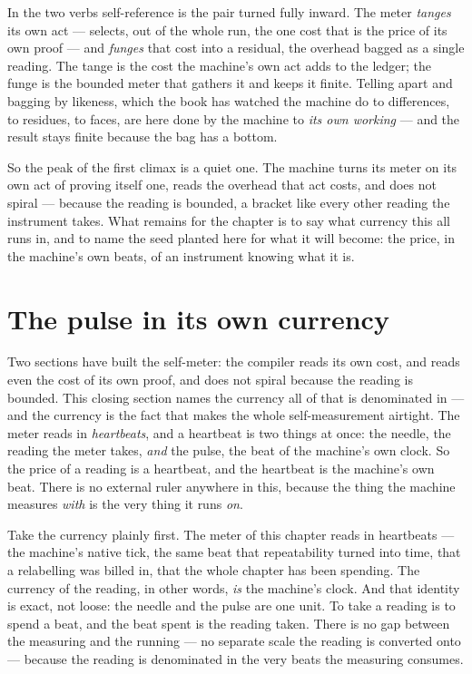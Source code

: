 In the two verbs self-reference is the pair turned fully inward. The meter \emph{tanges} its own act --- selects, out
of the whole run, the one cost that is the price of its own proof --- and \emph{funges} that cost into a residual, the
overhead bagged as a single reading. The tange is the cost the machine's own act adds to the ledger; the funge is the
bounded meter that gathers it and keeps it finite. Telling apart and bagging by likeness, which the book has watched
the machine do to differences, to residues, to faces, are here done by the machine to \emph{its own working} --- and
the result stays finite because the bag has a bottom.

So the peak of the first climax is a quiet one. The machine turns its meter on its own act of proving itself one, reads
the overhead that act costs, and does not spiral --- because the reading is bounded, a bracket like every other reading
the instrument takes. What remains for the chapter is to say what currency this all runs in, and to name the seed
planted here for what it will become: the price, in the machine's own beats, of an instrument knowing what it is.

\section{The pulse in its own currency}

Two sections have built the self-meter: the compiler reads its own cost, and reads even the cost of its own proof, and
does not spiral because the reading is bounded. This closing section names the currency all of that is denominated in
--- and the currency is the fact that makes the whole self-measurement airtight. The meter reads in \emph{heartbeats},
and a heartbeat is two things at once: the needle, the reading the meter takes, \emph{and} the pulse, the beat of the
machine's own clock. So the price of a reading is a heartbeat, and the heartbeat is the machine's own beat. There is no
external ruler anywhere in this, because the thing the machine measures \emph{with} is the very thing it runs \emph{on}.

Take the currency plainly first. The meter of this chapter reads in heartbeats --- the machine's native tick, the same
beat that repeatability turned into time, that a relabelling was billed in, that the whole chapter has been spending.
The currency of the reading, in other words, \emph{is} the machine's clock. And that identity is exact, not loose: the
needle and the pulse are one unit. To take a reading is to spend a beat, and the beat spent is the reading taken. There
is no gap between the measuring and the running --- no separate scale the reading is converted onto --- because the
reading is denominated in the very beats the measuring consumes.

